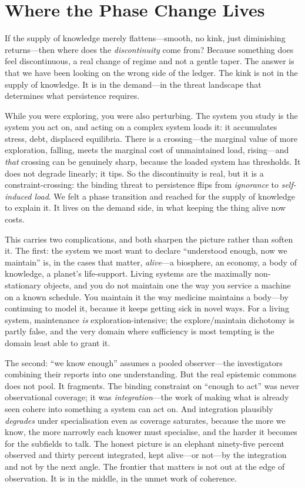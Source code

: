 \documentclass{article}
\begin{document}
\section*{Where the Phase Change Lives}

If the supply of knowledge merely flattens---smooth, no kink, just diminishing returns---then where does the \textit{discontinuity} come from? Because something does feel discontinuous, a real change of regime and not a gentle taper. The answer is that we have been looking on the wrong side of the ledger. The kink is not in the supply of knowledge. It is in the demand---in the threat landscape that determines what persistence requires.

While you were exploring, you were also perturbing. The system you study is the system you act on, and acting on a complex system loads it: it accumulates stress, debt, displaced equilibria. There is a crossing---the marginal value of more exploration, falling, meets the marginal cost of unmaintained load, rising---and \textit{that} crossing can be genuinely sharp, because the loaded system has thresholds. It does not degrade linearly; it tips. So the discontinuity is real, but it is a constraint-crossing: the binding threat to persistence flips from \textit{ignorance} to \textit{self-induced load}. We felt a phase transition and reached for the supply of knowledge to explain it. It lives on the demand side, in what keeping the thing alive now costs.

This carries two complications, and both sharpen the picture rather than soften it. The first: the system we most want to declare ``understood enough, now we maintain'' is, in the cases that matter, \textit{alive}---a biosphere, an economy, a body of knowledge, a planet's life-support. Living systems are the maximally non-stationary objects, and you do not maintain one the way you service a machine on a known schedule. You maintain it the way medicine maintains a body---by continuing to model it, because it keeps getting sick in novel ways. For a living system, maintenance \textit{is} exploration-intensive; the explore/maintain dichotomy is partly false, and the very domain where sufficiency is most tempting is the domain least able to grant it.

The second: ``we know enough'' assumes a pooled observer---the investigators combining their reports into one understanding. But the real epistemic commons does not pool. It fragments. The binding constraint on ``enough to act'' was never observational coverage; it was \textit{integration}---the work of making what is already seen cohere into something a system can act on. And integration plausibly \textit{degrades} under specialisation even as coverage saturates, because the more we know, the more narrowly each knower must specialise, and the harder it becomes for the subfields to talk. The honest picture is an elephant ninety-five percent observed and thirty percent integrated, kept alive---or not---by the integration and not by the next angle. The frontier that matters is not out at the edge of observation. It is in the middle, in the unmet work of coherence.
\end{document}
